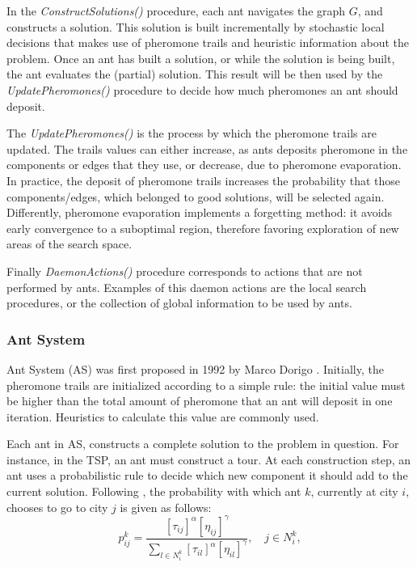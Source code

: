 				In the \emph{ConstructSolutions()} procedure, each ant navigates the graph $G$, and constructs a solution. This solution is built incrementally by stochastic local decisions that makes use of pheromone trails and heuristic information about the problem. Once an ant has built a solution, or while the solution is being built, the ant evaluates the (partial) solution. This result will be then used by the \emph{UpdatePheromones()} procedure to decide how much pheromones an ant should deposit.
				
				The \emph{UpdatePheromones()} is the process by which the pheromone trails are updated. The trails values can either increase, as ants deposits pheromone in the components or edges that they use, or decrease, due to pheromone evaporation. In practice, the deposit of pheromone trails increases the probability that those components/edges, which belonged to good solutions, will be selected again. Differently, pheromone evaporation implements a forgetting method: it avoids early convergence to a suboptimal region, therefore favoring exploration of new areas of the search space.
				 
				Finally \emph{DaemonActions()} procedure corresponds to actions that are not performed by ants. Examples of this daemon actions are the local search procedures, or the collection of global information to be used by ants.

					\subsubsection*{Ant System} 
					\label{sec:ant_system}
					Ant System (AS) was first proposed in 1992 by Marco Dorigo \cite{dorigo92, dorigo96}.
					Initially, the pheromone trails are initialized according to a simple rule: the initial value must be higher than the total amount of pheromone that an ant will deposit in one iteration. Heuristics to calculate this value are commonly used.

					Each ant in AS, constructs a complete solution to the problem in question. For instance, in the TSP, an ant must construct a tour. At each construction step, an ant uses a probabilistic rule to decide which new component it should add to the current solution. Following \cite{dorigo96}, the probability with which ant $k$, currently at city $i$, chooses to go to city $j$ is given as follows:
					\begin{equation}
						\label{eq:prob_rule_for_choice}
						p_{ij}^k = \frac{[\tau_{ij}]^\alpha[\eta_{ij}]^\gamma} {\sum_{l \in N_{i}^k} [\tau_{il}]^\alpha[\eta_{il}]^\gamma}, \quad j \in N_{i}^k,
					\end{equation}

